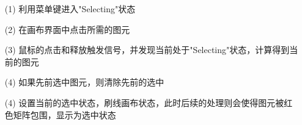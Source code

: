 \documentclass[a4paper,UTF8]{article}
\theoremstyle{definition}
\begin{document}
\begin{itemize}
    \item [(1)] 
    利用菜单键进入"Selecting"状态
    \item [(2)]
    在画布界面中点击所需的图元
    \item [(3)]
    鼠标的点击和释放触发信号，并发现当前处于"Selecting"状态，计算得到当前的图元
    \item [(4)]
    如果先前选中图元，则清除先前的选中
    \item [(4)]
    设置当前的选中状态，刷线画布状态，此时后续的处理则会使得图元被红色矩阵包围，显示为选中状态
  \end{itemize}

  \begin{figure}[htbp]
    \centering    %
     
    \subfigure[鼠标选中] %
    {
        \begin{minipage}{7cm}
        \centering      %

\end{minipage}}
\end{figure}
\end{document}
